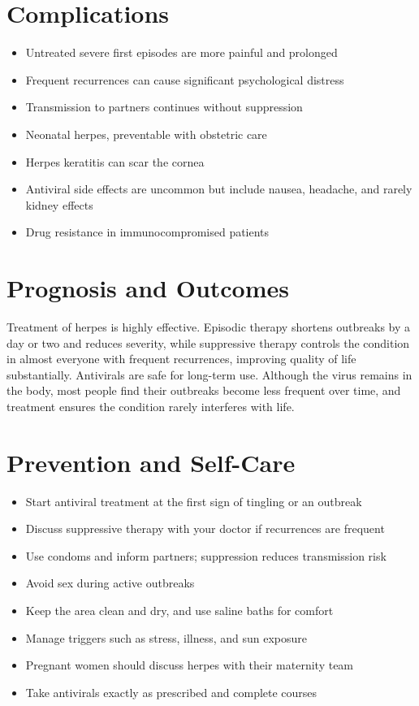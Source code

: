 \section*{Complications}
\begin{itemize}
    \item Untreated severe first episodes are more painful and prolonged
    \item Frequent recurrences can cause significant psychological distress
    \item Transmission to partners continues without suppression
    \item Neonatal herpes, preventable with obstetric care
    \item Herpes keratitis can scar the cornea
    \item Antiviral side effects are uncommon but include nausea, headache, and rarely kidney effects
    \item Drug resistance in immunocompromised patients
\end{itemize}

\section*{Prognosis and Outcomes}
Treatment of herpes is highly effective. Episodic therapy shortens outbreaks by a day or two and reduces severity, while suppressive therapy controls the condition in almost everyone with frequent recurrences, improving quality of life substantially. Antivirals are safe for long-term use. Although the virus remains in the body, most people find their outbreaks become less frequent over time, and treatment ensures the condition rarely interferes with life.

\section*{Prevention and Self-Care}
\begin{itemize}
    \item Start antiviral treatment at the first sign of tingling or an outbreak
    \item Discuss suppressive therapy with your doctor if recurrences are frequent
    \item Use condoms and inform partners; suppression reduces transmission risk
    \item Avoid sex during active outbreaks
    \item Keep the area clean and dry, and use saline baths for comfort
    \item Manage triggers such as stress, illness, and sun exposure
    \item Pregnant women should discuss herpes with their maternity team
    \item Take antivirals exactly as prescribed and complete courses
\end{itemize}

